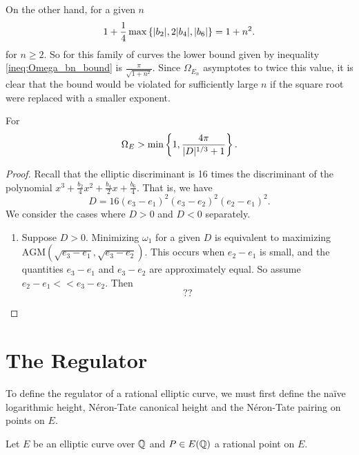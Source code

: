 \documentclass[10pt]{article}
\newcommand{\AGM}{\text{AGM}}
\begin{document}
On the other hand, for a given $n$
\begin{equation}
1+\frac{1}{4}\max\left\{|b_2|,2|b_4|,|b_6|\right\} = 1+n^2.
\end{equation}
for $n\ge 2$. So for this family of curves the lower bound given by inequality \ref{ineq:Omega_bn_bound} is $\frac{\pi}{\sqrt{1+n^2}}$. Since $\Omega_{E_n}$ asymptotes to twice this value, it is clear that the bound would be violated for sufficiently large $n$ if the square root were replaced with a smaller exponent.


\begin{theorem}[S.]
For 
\begin{equation}
\Omega_E > \min\left\{1,\frac{4\pi}{|D|^{1/3}+1}\right\}.
\end{equation}
\end{theorem}
\begin{proof}
Recall that the elliptic discriminant is 16 times the discriminant of the polynomial $x^3 + \frac{b_2}{4} x^2 + \frac{b_4}{2} x + \frac{b_6}{4}$. That is, we have
\begin{equation}
D = 16(e_3-e_1)^2(e_3-e_2)^2(e_2-e_1)^2.
\end{equation}
We consider the cases where $D>0$ and $D<0$ separately.
\begin{enumerate}
\item Suppose $D>0$. Minimizing $\omega_1$ for a given $D$ is equivalent to maximizing $\AGM(\sqrt{e_3-e_1},\sqrt{e_3-e_2})$. This occurs when $e_2-e_1$ is small, and the quantities $e_3-e_1$ and $e_3-e_2$ are approximately equal. So assume $e_2-e_1 << e_3-e_2$. Then
\begin{equation}
??
\end{equation}
\end{enumerate}
\end{proof}


\newpage
\section{The Regulator}

To define the regulator of a rational elliptic curve, we must first define the na\"ive logarithmic height, N\'eron-Tate canonical height and the N\'eron-Tate pairing on points on $E$.

Let $E$ be an elliptic curve over $\mathbb{Q}$ and $P \in E(\mathbb{Q})$ a rational point on $E$. 
\end{document}
